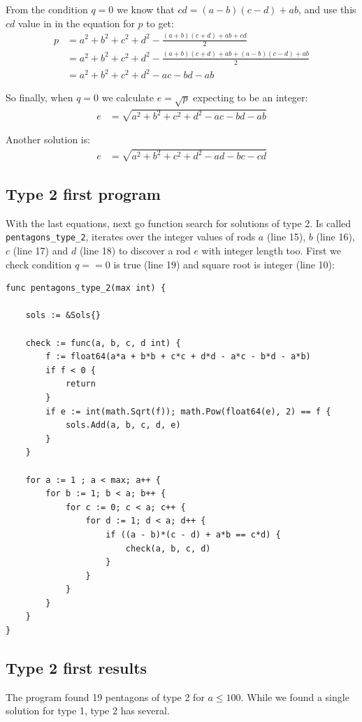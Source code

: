 \documentclass[11pt]{article}
\begin{document}
From the condition $q=0$ we know that $cd = (a-b)(c-d)+ab$, and use this $cd$ value in 
in the equation for $p$ to get:
\begin{align*}
p &= a^2+b^2+c^2+d^2 - \frac{(a+b)(c+d)+ab+cd}{2}\\
  &= a^2+b^2+c^2+d^2 - \frac{(a+b)(c+d)+ab+(a-b)(c-d)+ab}{2}\\
  &= a^2+b^2+c^2+d^2 -ac -bd -ab
\end{align*}

So finally, when $q=0$ we calculate $e = \sqrt{p}$ expecting to be an integer:
\begin{align*}
e &= \sqrt{a^2 + b^2 + c^2 + d^2 -ac -bd - ab}
\end{align*}

Another solution is:
\begin{align*}
e &= \sqrt{a^2 + b^2 + c^2 + d^2 -ad -bc - cd}
\end{align*}


\subsection{Type 2 first program}

With the last equations, next go function search for solutions of type 2.
Is called \texttt{pentagons\_type\_2}, iterates over the integer values of rods 
$a$ (line 15), $b$ (line 16), $c$ (line 17) and $d$ (line 18)
to discover a rod $e$ with integer length too. First we check condition $q == 0$ is
true (line 19) and square root is integer (line 10):
\begin{lstlisting}
func pentagons_type_2(max int) {

	sols := &Sols{}

	check := func(a, b, c, d int) {
		f := float64(a*a + b*b + c*c + d*d - a*c - b*d - a*b)
	    if f < 0 {
	    	return
	    }
		if e := int(math.Sqrt(f)); math.Pow(float64(e), 2) == f {
			sols.Add(a, b, c, d, e)
		}
	}

    for a := 1 ; a < max; a++ {
    	for b := 1; b < a; b++ {
        	for c := 0; c < a; c++ {
          		for d := 1; d < a; d++ {
            		if ((a - b)*(c - d) + a*b == c*d) {
              			check(a, b, c, d)
              		}
              	}
            }
        }
    }
}
\end{lstlisting}

\subsection{Type 2 first results}
The program found 19 pentagons of type 2 for $a \leq 100$.
While we found a single solution for type 1, type 2 has several.
\end{document}
